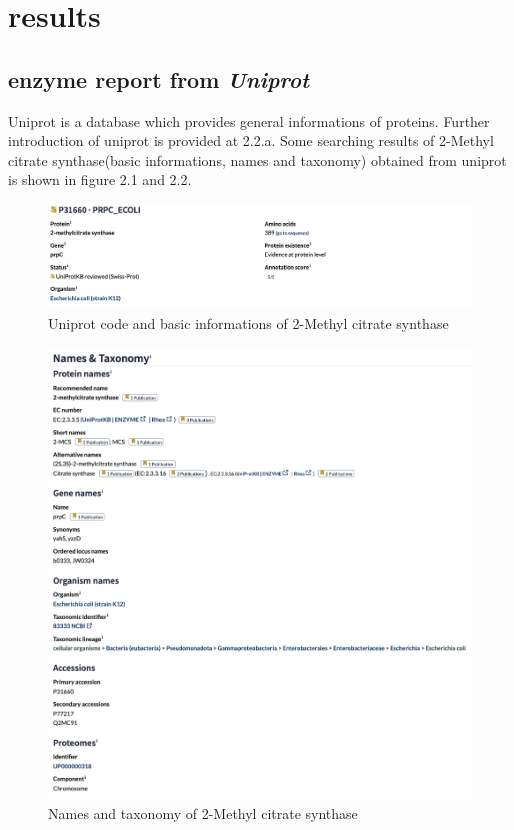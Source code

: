 \documentclass[a4paper,english,12pt,bibliography=totoc]{scrreprt}
\begin{document}
\section{results}

\subsection{enzyme report from \textit{Uniprot}}
Uniprot is a database which provides general informations of proteins. Further introduction of uniprot is provided at 2.2.a. Some searching results of 2-Methyl citrate synthase(basic informations, names and taxonomy) obtained from uniprot is shown in figure 2.1 and 2.2.\\

\begin{figure}[H]
    \centering
    \includegraphics[width=0.9\linewidth]{Project 2/Uniprot images/Basic information.png}
    \caption{Uniprot code and basic informations of 2-Methyl citrate synthase}
\end{figure}

\begin{figure}[H]
    \centering
    \includegraphics[width=0.9\linewidth]{Project 2/Uniprot images/Names and Taxonomy.png}
    \caption{Names and taxonomy of 2-Methyl citrate synthase}
\end{figure}
\end{document}
